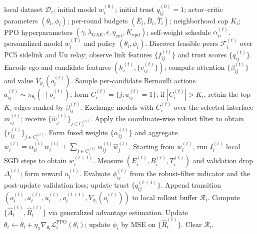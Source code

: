 \begin{algorithm}[t]
\caption{\textsc{Dante}: per-vehicle decentralized network formation and personalized learning, run locally by each vehicle $i$.}
\label{alg:dante}
\begin{algorithmic}[1]
\Require local dataset $\mathcal{D}_i$; initial model $w_i^{(0)}$; initial trust $q_{ij}^{(0)}\!=\!1$; actor--critic parameters $(\theta_i,\phi_i)$; per-round budgets $(\bar E_i,\bar B_i,\bar T_i)$; neighborhood cap $K_i$; PPO hyperparameters $(\gamma,\lambda_{\mathrm{GAE}},\epsilon,\eta_{\mathrm{ent}},K_{\mathrm{upd}})$; self-weight schedule $\alpha_{ii}^{(t)}$.
\Ensure personalized model $w_i^{(T)}$ and policy $(\theta_i,\phi_i)$.
    \State Discover feasible peers $\mathcal{F}_i^{(t)}$ over PC5 sidelink and Uu relay; observe link features $\{f_{ij}^{(t)}\}$ and trust scores $\{q_{ij}^{(t)}\}$.
    \State Encode ego and candidate features $(h_i^{(t)},\{v_{ij}^{(t)}\})$; compute attention $\{\beta_{ij}^{(t)}\}$ and value $V_{\phi_i}(o_i^{(t)})$.
    \State Sample per-candidate Bernoulli actions $a_{ij}^{(t)}\!\sim\!\pi_{\theta_i}(\cdot\mid o_i^{(t)})$; form $C_i^{(t)}\!=\!\{j:a_{ij}^{(t)}\!=\!1\}$; if $|C_i^{(t)}|\!>\!K_i$, retain the top-$K_i$ edges ranked by $\beta_{ij}^{(t)}$.
    \State Exchange models with $C_i^{(t)}$ over the selected interface $m_{ij}^{(t)}$; receive $\{\hat w_j^{(t)}\}_{j\in C_i^{(t)}}$.
    \State Apply the coordinate-wise robust filter to obtain $\{r_{ij}^{(t)}\}_{j\in C_i^{(t)}}$.
    \State Form fused weights $\{\alpha_{ij}^{(t)}\}$ and aggregate $\bar w_i^{(t)}=\alpha_{ii}^{(t)}w_i^{(t)}+\sum_{j\in C_i^{(t)}}\alpha_{ij}^{(t)}\hat w_j^{(t)}$.
    \State Starting from $\bar w_i^{(t)}$, run $I_i^{(t)}$ local SGD steps to obtain $w_i^{(t+1)}$.
    \State Measure $(E_i^{(t)},B_i^{(t)},T_i^{(t)})$ and validation drop $\Delta_i^{(t)}$; form reward $u_i^{(t)}$.
    \State Evaluate $\phi_{ij}^{(t)}$ from the robust-filter indicator and the post-update validation loss; update trust $\{q_{ij}^{(t+1)}\}$.
    \State Append transition $(o_i^{(t)},a_i^{(t)},u_i^{(t)},o_i^{(t+1)},V_{\phi_i}(o_i^{(t)}))$ to local rollout buffer $\mathcal{R}_i$.
        \State Compute $\{\hat A_i^{(t)},\hat R_i^{(t)}\}$ via generalized advantage estimation.
        \State Update $\theta_i\!\leftarrow\!\theta_i+\eta_\pi\nabla_{\theta_i}\mathcal{L}_i^{\mathrm{PPO}}(\theta_i)$; update $\phi_i$ by MSE on $\{\hat R_i^{(t)}\}$.
        \State Clear $\mathcal{R}_i$.
    \EndIf
\EndFor
\end{algorithmic}
\end{algorithm}


